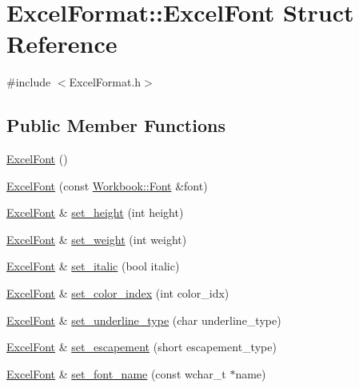 \hypertarget{struct_excel_format_1_1_excel_font}{}\section{Excel\+Format\+:\+:Excel\+Font Struct Reference}
\label{struct_excel_format_1_1_excel_font}


{\ttfamily \#include $<$Excel\+Format.\+h$>$}

\subsection*{Public Member Functions}
\begin{DoxyCompactItemize}
\item 
\hyperlink{struct_excel_format_1_1_excel_font_a06e546a746b5b731d48c1531f45e0b3b}{Excel\+Font} ()
\item 
\hyperlink{struct_excel_format_1_1_excel_font_affa5cb83d9b5be05ef394acd8452073b}{Excel\+Font} (const \hyperlink{struct_y_excel_1_1_workbook_1_1_font}{Workbook\+::\+Font} \&font)
\item 
\hyperlink{struct_excel_format_1_1_excel_font}{Excel\+Font} \& \hyperlink{struct_excel_format_1_1_excel_font_ad9eda977cf0f19737925b9dd738f0445}{set\+\_\+height} (int height)
\item 
\hyperlink{struct_excel_format_1_1_excel_font}{Excel\+Font} \& \hyperlink{struct_excel_format_1_1_excel_font_ae6457b21735f17cb6c24c1759e6aeecc}{set\+\_\+weight} (int weight)
\item 
\hyperlink{struct_excel_format_1_1_excel_font}{Excel\+Font} \& \hyperlink{struct_excel_format_1_1_excel_font_a893e59f906e610c249df9484bb6529dd}{set\+\_\+italic} (bool italic)
\item 
\hyperlink{struct_excel_format_1_1_excel_font}{Excel\+Font} \& \hyperlink{struct_excel_format_1_1_excel_font_a4f8bdbec4f4b32407fe678c9604bafe9}{set\+\_\+color\+\_\+index} (int color\+\_\+idx)
\item 
\hyperlink{struct_excel_format_1_1_excel_font}{Excel\+Font} \& \hyperlink{struct_excel_format_1_1_excel_font_ad51c538a26b70365f8712e84395656bd}{set\+\_\+underline\+\_\+type} (char underline\+\_\+type)
\item 
\hyperlink{struct_excel_format_1_1_excel_font}{Excel\+Font} \& \hyperlink{struct_excel_format_1_1_excel_font_a45ed6e358dee2e5863b983b6c17cb952}{set\+\_\+escapement} (short escapement\+\_\+type)
\item 
\hyperlink{struct_excel_format_1_1_excel_font}{Excel\+Font} \& \hyperlink{struct_excel_format_1_1_excel_font_a5351eb021de4e91a78c46fd914fb78be}{set\+\_\+font\+\_\+name} (const wchar\+\_\+t $\ast$name)

\end{DoxyCompactItemize}
